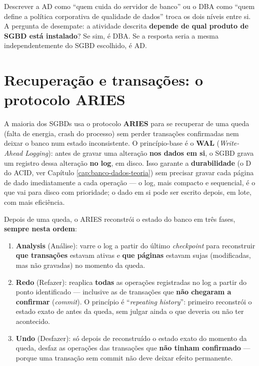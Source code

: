 \begin{cuidado}
Descrever a AD como “quem cuida do servidor de banco” ou o DBA como “quem
define a política corporativa de qualidade de dados” troca os dois níveis
entre si. A pergunta de desempate: a atividade descrita \textbf{depende de
qual produto de SGBD está instalado}? Se sim, é DBA. Se a resposta seria a
mesma independentemente do SGBD escolhido, é AD.
\end{cuidado}

\section{Recuperação e transações: o protocolo ARIES}

\begin{conceito}
A maioria dos SGBDs usa o protocolo \textbf{ARIES} para se recuperar de uma
queda (falta de energia, crash do processo) sem perder transações
confirmadas nem deixar o banco num estado inconsistente. O princípio-base é
o \textbf{WAL} (\textit{Write-Ahead Logging}): antes de gravar uma
alteração \textbf{nos dados em si}, o SGBD grava um registro dessa
alteração \textbf{no log}, em disco. Isso garante a \textbf{durabilidade}
(o D do ACID, ver Capítulo \ref{cap:banco-dados-teoria}) sem precisar
gravar cada página de dado imediatamente a cada operação --- o log, mais
compacto e sequencial, é o que vai para disco com prioridade; o dado em si
pode ser escrito depois, em lote, com mais eficiência.
\end{conceito}

\begin{conceito}
Depois de uma queda, o ARIES reconstrói o estado do banco em três fases,
\textbf{sempre nesta ordem}:
\begin{enumerate}
\item \textbf{Analysis} (Análise): varre o log a partir do último
\textit{checkpoint} para reconstruir \textbf{que transações} estavam
ativas e \textbf{que páginas} estavam sujas (modificadas, mas não
gravadas) no momento da queda.
\item \textbf{Redo} (Refazer): reaplica \textbf{todas} as operações
registradas no log a partir do ponto identificado --- inclusive as de
transações que \textbf{não chegaram a confirmar} (\textit{commit}). O
princípio é “\textit{repeating history}”: primeiro reconstrói o estado
exato de antes da queda, sem julgar ainda o que deveria ou não ter
acontecido.
\item \textbf{Undo} (Desfazer): só depois de reconstruído o estado exato do
momento da queda, desfaz as operações das transações que \textbf{não
tinham confirmado} --- porque uma transação sem commit não deve deixar
efeito permanente.
\end{enumerate}
\end{conceito}

